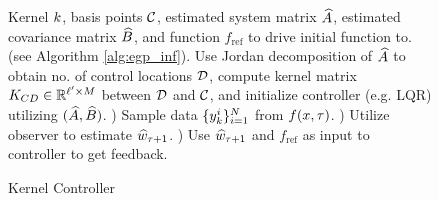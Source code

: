 \begin{figure}[tbh]
	\begin{algorithm}[H]
		\caption{Kernel Controller}
		\label{alg:egp_control}
		\begin{algorithmic}
				 Kernel $k$, basis points $\mathcal{C}$,
				estimated system matrix $\widehat{A}$, estimated covariance matrix $\widehat{B}$, and function $f_{\text{ref}}$ 
				to drive initial function to.    
				 (see Algorithm \ref{alg:egp_inf}). 
				 Use Jordan decomposition of $\widehat{A}$ to obtain  no. of control locations $\mathcal{D}$, compute kernel matrix $K_{CD}\in\mathbb{R}^{\ell'\times M}$ between $\mathcal{D}$ and $\mathcal{C}$, and initialize controller (e.g. LQR) utilizing $(\widehat{A}, \widehat{B})$.
				) Sample data $\{y^i_k\}_{i=1}^{N}$ from $f(x,\tau)$.    
				) Utilize observer to estimate $\widehat{w}_{\tau+1}$.
				) Use $\widehat{w}_{\tau+1}$ and $f_{\text{ref}}$ as input to controller to get feedback. 
				\ENDWHILE   
		\end{algorithmic}
	\end{algorithm}
	\vspace{-0.2in}
\end{figure}

